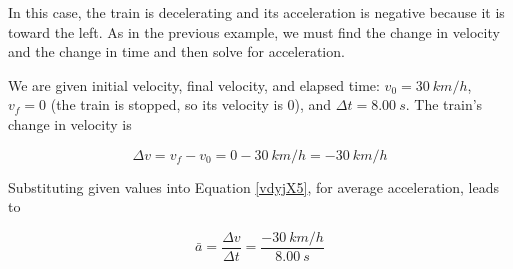 \documentclass[../../main-ap-physics.tex]{subfiles}
\begin{document}
\begin{center}
\end{center}

\Solution In this case, the train is decelerating and its acceleration is negative because it is toward the left. As in the previous example, we must find the change in velocity and the change in time and then solve for acceleration.

\vspace{1em}

We are given initial velocity, final velocity, and elapsed time: $v_0 = \SI{30}{km/h}$, $v_f = 0$ (the train is stopped, so its velocity is 0), and $\Delta t = \SI{8.00}{s}$. The train's change in velocity is

\begin{equation*}
    \Delta v = v_f - v_0 = 0 - \SI{30}{km/h} = -\SI{30}{km/h}
\end{equation*}

Substituting given values into Equation \ref{vdyjX5}, for average acceleration, leads to 

\begin{equation*}
    \bar{a} = \frac{\Delta v}{\Delta t} = \frac{-\SI{30}{km/h}}{\SI{8.00}{s}}
\end{equation*}
\end{document}
